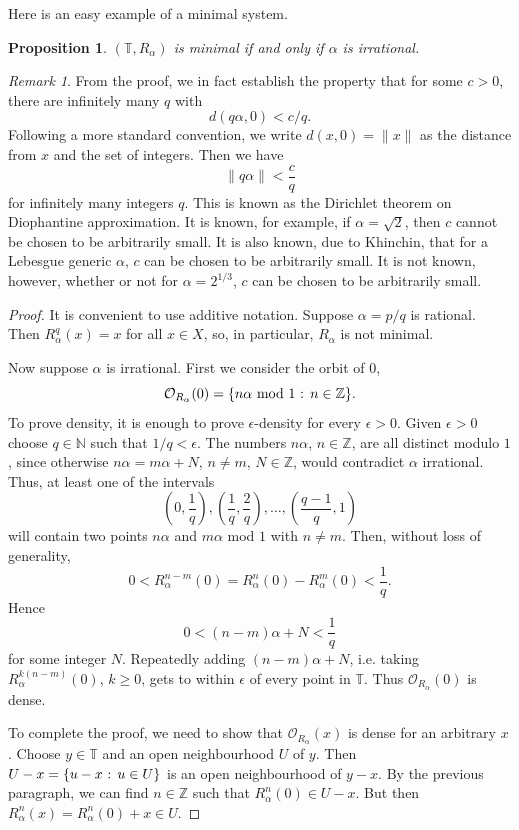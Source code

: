 \documentclass[12pt]{article}
\newtheorem{proposition}[theorem]{Proposition}
\theoremstyle{definition}
\theoremstyle{remark}
\newtheorem{remark}[theorem]{Remark}
\begin{document}
Here is an easy example of a minimal system.

\begin{proposition}
$(\mathbb T,R_\alpha)$ is minimal if and only if $\alpha$ is irrational.
\end{proposition}
\begin{remark}
    From the proof, we in fact establish the property that for some $c>0$, there are infinitely many $q$ with
    \[
    d(q\alpha,0)<c/q.
    \]
    Following a more standard convention, we write $d(x,0)=\|x\|$ as the distance from $x$ and the set of integers. Then we have
    \[
    \|q\alpha\|<\frac{c}{q}
    \]
    for infinitely many integers $q.$ This is known as the Dirichlet theorem on Diophantine approximation. It is known, for example, if $\alpha=\sqrt{2}$, then $c$ cannot be chosen to be arbitrarily small. It is also known, due to Khinchin, that for a Lebesgue generic $\alpha$, $c$ can be chosen to be arbitrarily small. It is not known, however, whether or not for $\alpha=2^{1/3}$, $c$ can be chosen to be arbitrarily small.
\end{remark}
\begin{proof} It is convenient to use additive notation.
Suppose $\alpha = p/q$ is rational. Then $R_\alpha^q(x)=x$ for all $x\in X$, so, in particular, $R_\alpha$ is not
minimal.

Now suppose $\alpha$ is irrational. 
First we consider the orbit of $0$,
\[
\mathcal O_{R_\alpha}(0) = \{n\alpha \ \text{mod} \ 1 \hbox{ : } n \in \mathbb Z\}.
\]
To prove density, it is enough to prove $\epsilon$-density for every $\epsilon>0$.
Given $\epsilon>0$ choose $q \in \mathbb N$ such that $1/q < \epsilon$.
The numbers
$n\alpha$, $n \in \mathbb Z$, are all distinct modulo $1$, since otherwise
$n\alpha = m\alpha + N$, $n \ne m$, $N \in \mathbb Z$, would contradict $\alpha$ irrational.
Thus, at least one of the intervals
\[
\left(0,\frac{1}{q}\right), \left(\frac{1}{q},\frac{2}{q}\right), \ldots, \left(\frac{q-1}{q},1\right)
\]
will contain two points 
$n\alpha$ and $m\alpha$ mod $1$
with $n \ne m$. Then, without loss of generality,
\[
0 < R_\alpha^{n-m}(0) = R_\alpha^n(0) - R_\alpha^m(0) < \frac{1}{q}.
\]
Hence
\[
0 < (n-m)\alpha + N < \frac{1}{q}
\]
for some integer $N$. Repeatedly adding $(n-m)\alpha + N$, i.e. taking
$R_\alpha^{k(n-m)}(0)$, $k \ge 0$, gets to within $\epsilon$ of every point in 
$\mathbb T$. Thus $\mathcal O_{R_\alpha}(0)$ is dense.

To complete the proof, we need to show that $\mathcal O_{R_\alpha}(x)$ is dense for an arbitrary $x$.
Choose $y \in \mathbb T$ and an open neighbourhood $U$ of $y$. Then $U-x = \{u-x \hbox{ : } u\in U\}$
is an open neighbourhood of $y-x$.
By the previous paragraph, we can find $n \in \mathbb Z$ such that
$R_\alpha^n(0) \in U-x$. But then $R_\alpha^n(x) = R_\alpha^n(0)+x \in U$.
\end{proof}
\end{document}

